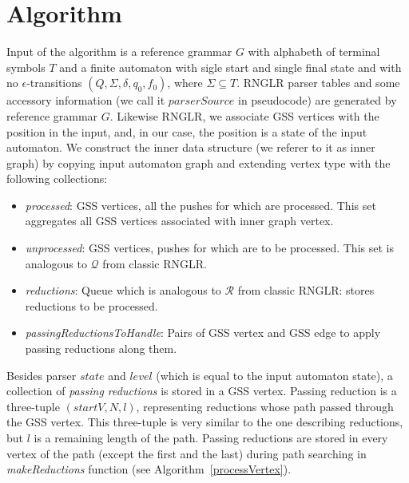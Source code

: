 \section{Algorithm}
Input of the algorithm is a reference grammar $G$ with alphabeth of terminal symbols $T$ 
and a finite automaton with sigle start and single final state and with no $\epsilon$-transitions $(Q, \Sigma, \delta, q_0, f_0)$, where 
$\Sigma \subseteq T$. RNGLR parser tables and some accessory information (we call it $parserSource$ 
in pseudocode) are generated by reference grammar $G$. 
Likewise RNGLR, we associate GSS vertices with the position in the input,
and, in our case, the position is a state of the input automaton. We construct the inner 
data structure (we referer to it as inner graph) by copying input automaton graph and extending vertex type with 
the following collections: 
\begin{itemize}
  \item \emph{processed}: GSS vertices, all the pushes for which are processed. 
                             This set aggregates all GSS vertices associated with inner graph vertex.
  \item \emph{unprocessed}: GSS vertices, pushes for which are to be processed. 
                               This set is analogous to $\mathcal{Q}$ from classic RNGLR.
  \item \emph{reductions}: Queue which is analogous to $\mathcal{R}$ from classic RNGLR: 
                              stores reductions to be processed.
  \item \emph{passingReductionsToHandle}: Pairs of GSS vertex and GSS edge to apply passing reductions along them.
\end{itemize}
Besides parser $state$ and $level$ (which is equal to the input automaton state), 
a collection of \emph{passing reductions} is stored in a GSS vertex. Passing reduction is a 
three-tuple $(startV, N, l)$, representing reductions whose path passed through 
the GSS vertex. This three-tuple is very similar to the one describing reductions, 
but $l$ is a remaining length of the path. Passing reductions are 
stored in every vertex of the path (except the first and the last) during path 
searching in \emph{makeReductions} function (see Algorithm~\ref{processVertex}).


